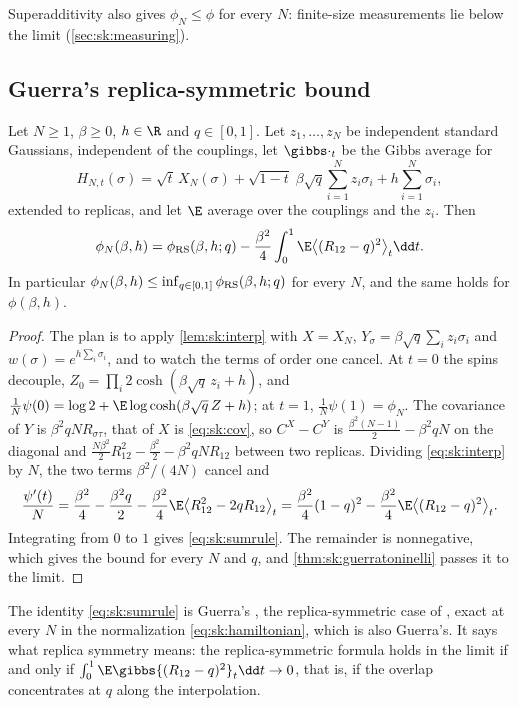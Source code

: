 \begin{refsection}
Superadditivity also gives $\phi_N\le\phi$ for every $N$: finite-size measurements lie below the limit (\cref{sec:sk:measuring}).

\subsection{Guerra's replica-symmetric bound}\label{sec:sk:rsbound}

\begin{theorem}\label{thm:sk:rsbound}
Let $N\ge1$, $\beta\ge0$, $h\in\R$ and $q\in[0,1]$. Let $z_1,\dots,z_N$ be independent standard Gaussians, independent of the couplings, let $\gibbs\cdot_t$ be the Gibbs average for
\[
H_{N,t}(\sigma)=\sqrt t\,X_N(\sigma)+\sqrt{1-t}\;\beta\sqrt q\sum_{i=1}^Nz_i\sigma_i+h\sum_{i=1}^N\sigma_i,
\]
extended to replicas, and let $\E$ average over the couplings and the $z_i$. Then
\begin{equation}\label{eq:sk:sumrule}
\phi_N(\beta,h)=\skRS(\beta,h;q)-\frac{\beta^2}4\int_0^1\E\bigl\langle(R_{12}-q)^2\bigr\rangle_t\dd t .
\end{equation}
In particular $\phi_N(\beta,h)\le\inf_{q\in[0,1]}\phi_{\mathrm{RS}}(\beta,h;q)$ for every $N$, and the same holds for $\phi(\beta,h)$.
\end{theorem}

\begin{proof}
The plan is to apply \cref{lem:sk:interp} with $X=X_N$, $Y_\sigma=\beta\sqrt q\sum_iz_i\sigma_i$ and $w(\sigma)=e^{h\sum_i\sigma_i}$, and to watch the terms of order one cancel. At $t=0$ the spins decouple, $Z_0=\prod_i2\cosh(\beta\sqrt q\,z_i+h)$, and $\frac1N\psi(0)=\log2+\E\log\cosh(\beta\sqrt q\,Z+h)$; at $t=1$, $\frac1N\psi(1)=\phi_N$. The covariance of $Y$ is $\beta^2qNR_{\sigma\tau}$, that of $X$ is \eqref{eq:sk:cov}, so $C^X-C^Y$ is $\frac{\beta^2(N-1)}2-\beta^2qN$ on the diagonal and $\frac{N\beta^2}2R_{12}^2-\frac{\beta^2}2-\beta^2qNR_{12}$ between two replicas. Dividing \eqref{eq:sk:interp} by $N$, the two terms $\beta^2/(4N)$ cancel and
\[
\frac{\psi'(t)}N=\frac{\beta^2}4-\frac{\beta^2q}2-\frac{\beta^2}4\E\bigl\langle R_{12}^2-2qR_{12}\bigr\rangle_t=\frac{\beta^2}4(1-q)^2-\frac{\beta^2}4\E\bigl\langle(R_{12}-q)^2\bigr\rangle_t .
\]
Integrating from $0$ to $1$ gives \eqref{eq:sk:sumrule}. The remainder is nonnegative, which gives the bound for every $N$ and $q$, and \cref{thm:sk:guerratoninelli} passes it to the limit.
\end{proof}

The identity \eqref{eq:sk:sumrule} is Guerra's , the replica-symmetric case of \textcite[Thm.~5]{Guerra2003}, exact at every $N$ in the normalization \eqref{eq:sk:hamiltonian}, which is also Guerra's. It says what replica symmetry means: the replica-symmetric formula holds in the limit if and only if $\int_0^1\E\gibbs{(R_{12}-q)^2}_t\dd t\to0$, that is, if the overlap concentrates at $q$ along the interpolation.


\end{refsection}
